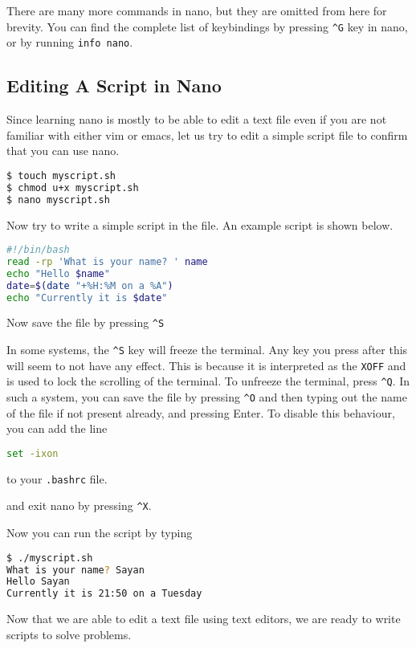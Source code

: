 There are many more commands in nano, but they are
omitted from here for brevity. You can find the
complete list of keybindings by pressing \texttt{\textasciicircum G}
key in nano, or by running \lstinline[language=bash]{info nano}.

\subsection{Editing A Script in Nano}

Since learning nano is mostly to be able to edit
a text file even if you are not familiar with
either vim or emacs, let us try to edit a simple
script file to confirm that you can use nano.

\begin{lstlisting}[language=bash]
$ touch myscript.sh
$ chmod u+x myscript.sh
$ nano myscript.sh
\end{lstlisting}

Now try to write a simple script in the file.
An example script is shown below.

\begin{lstlisting}[language=bash]
#!/bin/bash
read -rp 'What is your name? ' name
echo "Hello $name"
date=$(date "+%H:%M on a %A")
echo "Currently it is $date"
\end{lstlisting}


Now save the file by pressing \texttt{\textasciicircum S}
\begin{remark}
  In some systems, the \texttt{\textasciicircum S} key
  will freeze the terminal. Any key you press after this
  will seem to not have any effect.
  This is because it is interpreted as the \texttt{XOFF}
  and is used to lock the scrolling of the terminal.
  To unfreeze the terminal, press \texttt{\textasciicircum Q}.
  In such a system, you can save the file by pressing
  \texttt{\textasciicircum O} and then typing out the
  name of the file if not present already, and pressing
  Enter.
  To disable this behaviour, you can add the line
  \begin{lstlisting}[language=bash]
  set -ixon \end{lstlisting}
  to your \texttt{.bashrc} file.
\end{remark}
and exit nano by pressing \texttt{\textasciicircum X}.

Now you can run the script by typing

\begin{lstlisting}[language=bash]
$ ./myscript.sh
What is your name? Sayan
Hello Sayan
Currently it is 21:50 on a Tuesday
\end{lstlisting}

Now that we are able to edit a text file using text editors,
we are ready to write scripts to solve problems.
